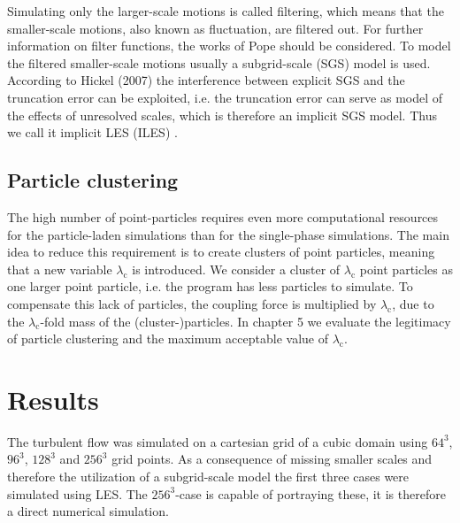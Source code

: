 \documentclass[11pt,a4paper,openany,oneside,parskip=half*]{article}
\begin{document}
Simulating only the larger-scale motions is called filtering, which means that the smaller-scale motions, also known as fluctuation, are filtered out. For further information on filter functions, the works of Pope \cite{turbulentFlows} should be considered. To model the filtered smaller-scale motions usually a subgrid-scale (SGS) model is used. According to Hickel (2007) the interference between explicit SGS and the truncation error can be exploited, i.e. the truncation error can serve as model of the effects of unresolved scales, which is therefore an implicit SGS model. Thus we call it implicit LES (ILES) \cite{implicitLES}. %
\subsection{Particle clustering}
The high number of point-particles requires even more computational resources for the particle-laden simulations than for the single-phase simulations. The main idea to reduce this requirement is to create clusters of point particles, meaning that a new variable $\lambda_\mathrm{c}$ is introduced. We consider a cluster of $\lambda_\mathrm{c}$ point particles as one larger point particle, i.e. the program has less particles to simulate. To compensate this lack of particles, the coupling force is multiplied by $\lambda_\mathrm{c}$, due to the $\lambda_\mathrm{c}$-fold mass of the (cluster-)particles. In chapter 5 we evaluate the legitimacy of particle clustering and the maximum acceptable value of $\lambda_\mathrm{c}$.
\pagebreak
\section{Results}
The turbulent flow was simulated on a cartesian grid of a cubic domain using $64^3$, $96^3$, $128^3$ and $256^3$ grid points. As a consequence of missing smaller scales and therefore the utilization of a subgrid-scale model the first three cases were simulated using LES. The $256^3$-case is capable of portraying these, it is therefore a direct numerical simulation. 
\end{document}
